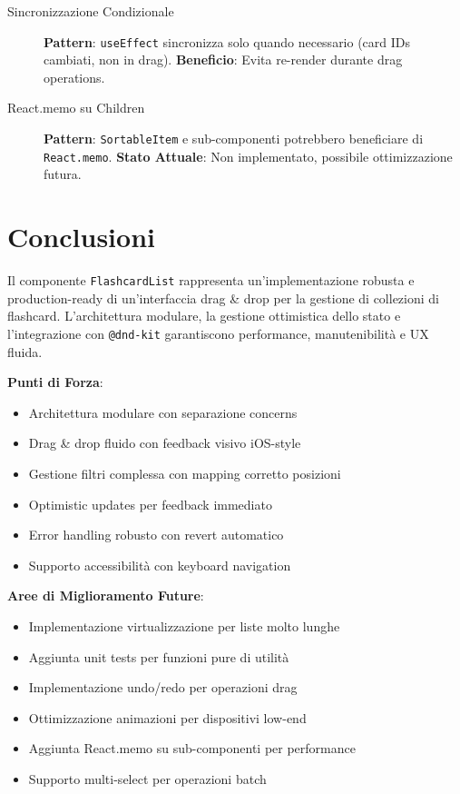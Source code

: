 \documentclass[11pt,a4paper]{article}
\begin{document}
\begin{description}
    \item[Sincronizzazione Condizionale] \textbf{Pattern}: \texttt{useEffect} sincronizza solo quando necessario (card IDs cambiati, non in drag). \textbf{Beneficio}: Evita re-render durante drag operations.
    
    \item[React.memo su Children] \textbf{Pattern}: \texttt{SortableItem} e sub-componenti potrebbero beneficiare di \texttt{React.memo}. \textbf{Stato Attuale}: Non implementato, possibile ottimizzazione futura.
\end{description}


\section{Conclusioni}

Il componente \texttt{FlashcardList} rappresenta un'implementazione robusta e production-ready di un'interfaccia drag \& drop per la gestione di collezioni di flashcard. L'architettura modulare, la gestione ottimistica dello stato e l'integrazione con \texttt{@dnd-kit} garantiscono performance, manutenibilità e UX fluida.

\textbf{Punti di Forza}:
\begin{itemize}
    \item Architettura modulare con separazione concerns
    \item Drag \& drop fluido con feedback visivo iOS-style
    \item Gestione filtri complessa con mapping corretto posizioni
    \item Optimistic updates per feedback immediato
    \item Error handling robusto con revert automatico
    \item Supporto accessibilità con keyboard navigation
\end{itemize}

\textbf{Aree di Miglioramento Future}:
\begin{itemize}
    \item Implementazione virtualizzazione per liste molto lunghe
    \item Aggiunta unit tests per funzioni pure di utilità
    \item Implementazione undo/redo per operazioni drag
    \item Ottimizzazione animazioni per dispositivi low-end
    \item Aggiunta React.memo su sub-componenti per performance
    \item Supporto multi-select per operazioni batch
\end{itemize}
\end{document}
